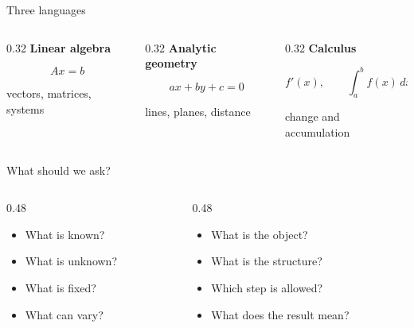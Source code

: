 \documentclass[aspectratio=169,11pt]{beamer}
\newcommand{\keyword}[1]{\textbf{#1}}
\begin{document}
\begin{frame}{Three languages}
  \Large
  \begin{columns}[T]
    \begin{column}{0.32\textwidth}
      \centering
      \keyword{Linear algebra}

      \vspace{0.4cm}
      \[
        A x = b
      \]

      \normalsize
      vectors, matrices, systems
    \end{column}

    \begin{column}{0.32\textwidth}
      \centering
      \keyword{Analytic geometry}

      \vspace{0.4cm}
      \[
        ax+by+c=0
      \]

      \normalsize
      lines, planes, distance
    \end{column}

    \begin{column}{0.32\textwidth}
      \centering
      \keyword{Calculus}

      \vspace{0.4cm}
      \[
        f'(x),\qquad \int_a^b f(x)\,dx
      \]

      \normalsize
      change and accumulation
    \end{column}
  \end{columns}
\end{frame}

\begin{frame}{What should we ask?}
  \Large
  \begin{columns}[T]
    \begin{column}{0.48\textwidth}
      \begin{itemize}
        \item What is known?
        \item What is unknown?
        \item What is fixed?
        \item What can vary?
      \end{itemize}
    \end{column}
    \begin{column}{0.48\textwidth}
      \begin{itemize}
        \item What is the object?
        \item What is the structure?
        \item Which step is allowed?
        \item What does the result mean?
      \end{itemize}
    \end{column}
  \end{columns}
\end{frame}
\end{document}
